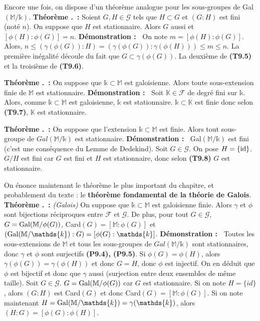 \documentclass[5pt,a4paper]{article}
\newcounter{thm}[section]
\renewcommand{\thethm}{\thesection.\arabic{thm}}
\newcommand{\thm}[1]{\stepcounter{thm}\noindent\textbf{Théorème \thethm ~:} #1 \newline}
\newcommand{\demo}[1]{\textbf{Démonstration :~} #1 \newline}
\begin{document}
\begin{onehalfspacing}
Encore une fois, on dispose d'un théorème analogue pour les sous-groupes de Gal$(\mathbb{M}/\mathds{k})$.
\newline
\thm{Soient $G,H \in \mathcal{G}$ tels que $H \subset G$ et $(G : H)$ est fini (noté $n$). On suppose que $H$ est stationnaire. Alors $G$ aussi et $[\phi(H) : \phi(G)] = n$.}
\demo{On note $m = [\phi(H) : \phi(G)]$. Alors, $n \leq (\gamma(\phi(G)) : H) = (\gamma(\phi(G)) : \gamma(\phi(H))) \leq m \leq n$. La première inégalité découle du fait que $G \subset \gamma(\phi(G))$. La deuxième de \textbf{(T9.5)} et la troisième de \textbf{(T9.6)}.}


\thm{On suppose que $\mathds{k} \subset \mathbb{M}$ est galoisienne. Alors toute sous-extension finie de $\mathbb{M}$ est stationnaire.}
\demo{Soit $\mathbb{K} \in \mathcal{F}$ de degré fini sur $\mathds{k}$. Alors, comme $\mathds{k} \subset \mathbb{M}$ est galoisienne, $\mathds{k}$ est stationnaire. $\mathds{k} \subset \mathbb{K}$ est finie donc selon \textbf{(T9.7)}, $\mathbb{K}$ est stationnaire.}


\thm{On suppose que l'extension $\mathds{k} \subset \mathbb{M}$ est finie. Alors tout sous-groupe de $Gal(\mathbb{M}/\mathds{k})$ est stationnaire.}
\demo{Gal$(\mathbb{M}/\mathds{k})$ est fini (c'est une conséquence du Lemme de Dedekind). Soit $G \in \mathcal{G}$. On pose $H = \{\textup{id}\}$. $G/H$ est fini car $G$ est fini et $H$ est stationnaire, donc selon \textbf{(T9.8)} $G$ est stationnaire.}


On énonce maintenant le théorème le plus important du chapitre, et probablement du texte : le \textbf{théorème fondamental de la théorie de Galois}.
\newline
\thm{\textit{(Galois)} On suppose que $\mathds{k} \subset \mathbb{M}$ est galoisienne finie. Alors $\gamma$ et $\phi$ sont bijections réciproques entre $\mathcal{F}$ et $\mathcal{G}$. De plus, pour tout $G \in \mathcal{G}$, $G = \textup{Gal}(\mathbb{M}/\phi(G))$, Card$(G) = [\mathbb{M} : \phi(G)]$ et $(\textup{Gal}(\mathbb{M}/\mathds{k}) : G) = [\phi(G) : \mathds{k}]$.}
\demo{Toutes les sous-extensions de $\mathbb{M}$ et tous les sous-groupes de $Gal(\mathbb{M}/\mathds{k})$ sont stationnaires, donc $\gamma$ et $\phi$ sont surjectifs \textbf{(P9.4), (P9.5)}. Si $\phi(G) = \phi(H)$, alors $\gamma(\phi(G)) = \gamma(\phi(H))$ et donc $G = H$, donc $\phi$ est injectif. On en déduit que $\phi$ est bijectif et donc que $\gamma$ aussi (surjection entre deux ensembles de même taille). Soit $G \in \mathcal{G}$. $G = \textup{Gal}(\mathbb{M}/\phi(G))$ car $G$ est stationnaire. Si on note $H = \{id\}$, alors $(G : H)$ est Card$(G)$ et donc Card$(G) = [\mathbb{M} : \phi(G)]$. Si on note maintenant $H = \textup{Gal}(\mathbb{M}/\mathds{k}) = \gamma(\mathds{k})$, alors $(H : G) = [\phi(G) : \phi(H)]$.}


\end{onehalfspacing}
\end{document}
